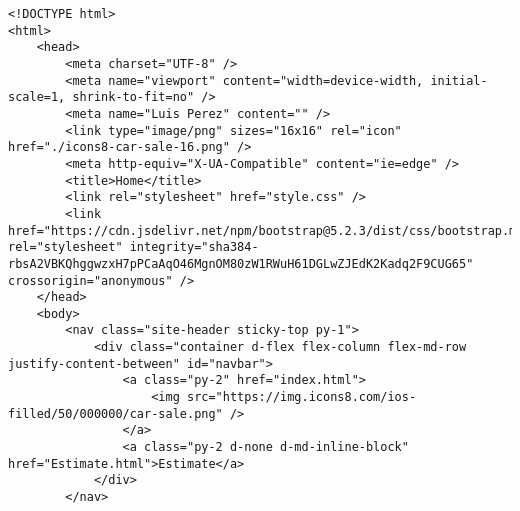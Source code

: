 \makeatletter
\makeatother
\begin{lstlisting}[style=htmlcssjs]
<!DOCTYPE html>
<html>
    <head>
        <meta charset="UTF-8" />
        <meta name="viewport" content="width=device-width, initial-scale=1, shrink-to-fit=no" />
        <meta name="Luis Perez" content="" />
        <link type="image/png" sizes="16x16" rel="icon" href="./icons8-car-sale-16.png" />
        <meta http-equiv="X-UA-Compatible" content="ie=edge" />
        <title>Home</title>
        <link rel="stylesheet" href="style.css" />
        <link href="https://cdn.jsdelivr.net/npm/bootstrap@5.2.3/dist/css/bootstrap.min.css" rel="stylesheet" integrity="sha384-rbsA2VBKQhggwzxH7pPCaAqO46MgnOM80zW1RWuH61DGLwZJEdK2Kadq2F9CUG65" crossorigin="anonymous" />
    </head>
    <body>
        <nav class="site-header sticky-top py-1">
            <div class="container d-flex flex-column flex-md-row justify-content-between" id="navbar">
                <a class="py-2" href="index.html">
                    <img src="https://img.icons8.com/ios-filled/50/000000/car-sale.png" />
                </a>
                <a class="py-2 d-none d-md-inline-block" href="Estimate.html">Estimate</a>
            </div>
        </nav>


\end{lstlisting}
